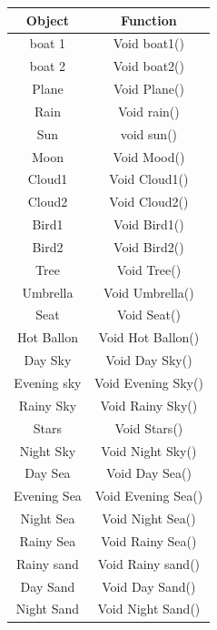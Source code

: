 \documentclass{article}
\begin{document}
\begin{center}
\begin{tabular}{c|c}
    \hline
   \textbf{Object}  & \textbf{Function} \\
    \hline
    boat 1 & Void boat1() \\
    \hline
    boat 2 & Void boat2() \\
    \hline
    Plane & Void Plane()\\
    \hline
     Rain & Void rain() \\
    \hline
    Sun & void sun() \\
    \hline
    Moon & Void Mood()\\
    \hline
    Cloud1 & Void Cloud1() \\
    \hline
    Cloud2 & Void Cloud2() \\
    \hline
    Bird1 & Void Bird1() \\
    \hline
    Bird2 & Void Bird2() \\
    \hline
    Tree & Void Tree() \\
    \hline
    Umbrella & Void Umbrella() \\
    \hline
    Seat & Void Seat() \\
    \hline
    Hot Ballon & Void Hot Ballon() \\
    \hline
    Day Sky & Void Day Sky() \\
    \hline
    Evening sky & Void Evening Sky() \\
    \hline
     Rainy Sky & Void Rainy Sky() \\
    \hline
     Stars & Void Stars() \\
    \hline
     Night Sky & Void Night Sky() \\
    \hline
    Day Sea & Void  Day Sea() \\
    \hline
     Evening Sea & Void Evening Sea() \\
    \hline
     Night Sea & Void Night Sea() \\
    \hline
     Rainy Sea & Void Rainy Sea() \\
    \hline
    Rainy sand & Void Rainy sand() \\
    \hline
    Day Sand & Void Day Sand() \\
    \hline
    Night Sand & Void Night Sand() \\
    
    
    
    
\end{tabular}
\\
    \\
\end{center}
\end{document}
